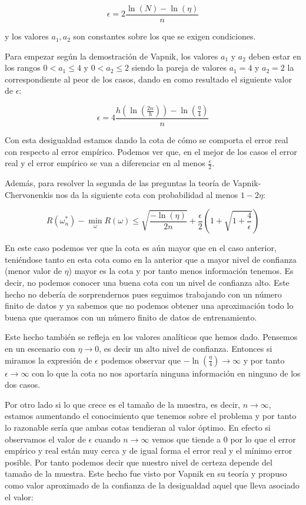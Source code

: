 $$\epsilon = 2\frac{\ln (N) - \ln (\eta)}{n}$$

y los valores $a_1 , a_2$ son constantes sobre los que se exigen condiciones.

Para empezar según la demostración de Vapnik, los valores $a_1$ y $a_2$ deben estar en los rangos $0<a_1 \leq 4$ y $0<a_2 \leq 2$ siendo la pareja de valores $a_1 = 4$ y $a_2 = 2$ la correspondiente al peor de los casos, dando en como resultado el siguiente valor de $\epsilon$:

$$\epsilon = 4\frac{h(\ln (\frac{2n}{h})) - \ln (\frac{\eta}{4})}{n}$$

Con esta desigualdad estamos dando la cota de cómo se comporta el error real con respecto al error empírico. Podemos ver que, en el mejor de los casos el error real y el error empírico se van a diferenciar en al menos $\frac{\epsilon}{2}$.

Además, para resolver la segunda de las preguntas la teoría de Vapnik-Chervonenkis nos da la siguiente cota con probabilidad al menos $1-2\eta$:

$$R(\omega_n^*)-\min_{\omega} R(\omega) \leq \sqrt{\frac{-\ln (\eta)}{2n}} + \frac{\epsilon}{2} (1+\sqrt{1+\frac{4}{\epsilon}})$$

En este caso podemos ver que la cota es aún mayor que en el caso anterior, teniéndose tanto en esta cota como en la anterior que a mayor nivel de confianza (menor valor de $\eta$) mayor es la cota y por tanto menos información tenemos. Es decir, no podemos conocer una buena cota con un nivel de confianza alto. Este hecho no debería de sorprendernos pues seguimos trabajando con un número finito de datos y ya sabemos que no podemos obtener una aproximación todo lo buena que queramos con un número finito de datos de entrenamiento.

Este hecho también se refleja en los valores analíticos que hemos dado. Pensemos en un escenario con $\eta \rightarrow 0$, es decir un alto nivel de confianza. Entonces si miramos la expresión de $\epsilon$ podemos observar que $-\ln (\frac{\eta}{4})\rightarrow \infty$ y por tanto $\epsilon \rightarrow \infty$ con lo que la cota no nos aportaría ninguna información en ninguno de los dos casos.

Por otro lado si lo que crece es el tamaño de la muestra, es decir, $n\rightarrow \infty$, estamos aumentando el conocimiento que tenemos sobre el problema y por tanto lo razonable sería que ambas cotas tendieran al valor óptimo. En efecto si observamos el valor de $\epsilon$ cuando $n\rightarrow \infty$ vemos que tiende a $0$ por lo que el error empírico y real están muy cerca y de igual forma el error real y el mínimo error posible. Por tanto podemos decir que nuestro nivel de certeza depende del tamaño de la muestra. Este hecho fue visto por Vapnik en su teoría y propuso como valor aproximado de la confianza de la desigualdad aquel que lleva asociado el valor:

